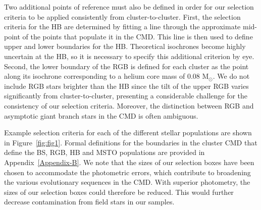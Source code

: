 Two additional points of reference must also
be defined in order for our selection criteria to be applied 
consistently from cluster-to-cluster.  First, the selection criteria 
for the HB are determined by fitting a line through the approximate
mid-point of the points that populate it in the CMD.  This
line is then used to define upper and lower boundaries for the
HB.  Theoretical isochrones become highly uncertain at the HB, so it
is necessary to specify this additional criterion by eye.  Second, the
lower boundary of the RGB is defined for each cluster as 
the point along its isochrone corresponding to a helium core mass of
0.08 M$_{\odot}$.  We do not include RGB
stars brighter than the HB since the tilt 
of the upper RGB varies significantly from cluster-to-cluster, 
presenting a considerable challenge for the consistency of our
selection criteria.  Moreover, the distinction between RGB and
asymptotic giant branch stars in the CMD is often ambiguous.

Example selection criteria for each of the different stellar
populations are shown in Figure~\ref{fig:fig1}.  Formal definitions
for the boundaries in the cluster CMD 
that define the BS, RGB, HB and MSTO populations are provided in
Appendix~\ref{Appendix-B}.  We note that the sizes of our selection
boxes have been chosen to accommodate the photometric errors, which
contribute to broadening the various evolutionary sequences in the
CMD.  With superior photometry, the sizes of our selection
boxes could therefore be reduced.  This would further 
decrease contamination from field stars in our samples.

